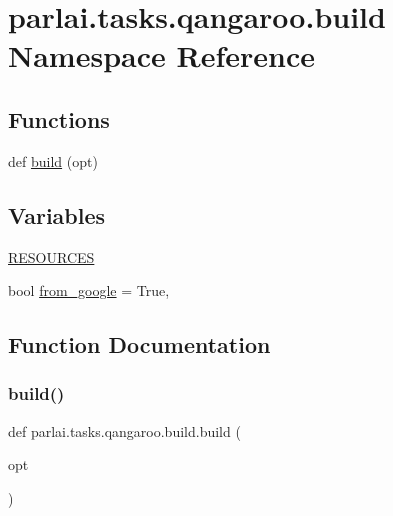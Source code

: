 \hypertarget{namespaceparlai_1_1tasks_1_1qangaroo_1_1build}{}\section{parlai.\+tasks.\+qangaroo.\+build Namespace Reference}
\label{namespaceparlai_1_1tasks_1_1qangaroo_1_1build}
\subsection*{Functions}
\begin{DoxyCompactItemize}
\item 
def \hyperlink{namespaceparlai_1_1tasks_1_1qangaroo_1_1build_a589f782a002790f9ff6a72dae2233368}{build} (opt)
\end{DoxyCompactItemize}
\subsection*{Variables}
\begin{DoxyCompactItemize}
\item 
\hyperlink{namespaceparlai_1_1tasks_1_1qangaroo_1_1build_a9df9ad31290da5c6e60e353e6e69afa1}{R\+E\+S\+O\+U\+R\+C\+ES}
\item 
bool \hyperlink{namespaceparlai_1_1tasks_1_1qangaroo_1_1build_aefce1721bef5d264c1fa4a9218dc61c8}{from\+\_\+google} = True,
\end{DoxyCompactItemize}


\subsection{Function Documentation}
\mbox{\label{namespaceparlai_1_1tasks_1_1qangaroo_1_1build_a589f782a002790f9ff6a72dae2233368}} 
\subsubsection{\texorpdfstring{build()}{build()}}
{\footnotesize\ttfamily def parlai.\+tasks.\+qangaroo.\+build.\+build (\begin{DoxyParamCaption}\item[{}]{opt }\end{DoxyParamCaption})}



